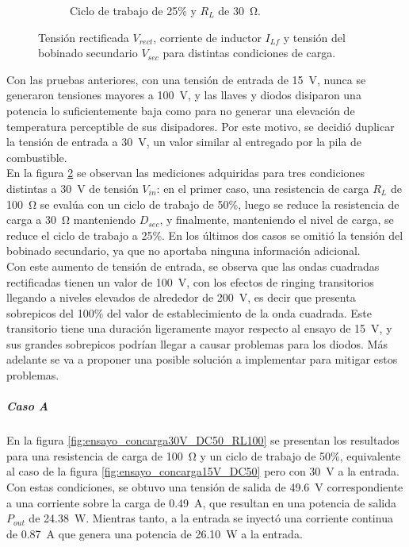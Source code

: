 \begin{figure}[h]
\begin{subfigure}{0.48\textwidth}
        \caption{Ciclo de trabajo de 25\% y $R_L$ de \SI[]{30}{\ohm}.}
        \label{fig:ensayo_concarga30V_DC25_RL30}
    \end{subfigure}
    \caption{Tensión rectificada $V_{rect}$, corriente de inductor $I_{Lf}$ y tensión del bobinado secundario $V_{sec}$ para distintas condiciones de carga.}
    \label{fig:ensayo_concarga30V}
\end{figure}

Con las pruebas anteriores, con una tensión de entrada de \SI[]{15}{\volt}, nunca se generaron tensiones mayores a \SI[]{100}{\volt}, y las llaves y diodos disiparon una potencia lo suficientemente baja como para no generar una elevación de temperatura perceptible de sus disipadores. Por este motivo, se decidió duplicar la tensión de entrada a \SI[]{30}{\volt}, un valor similar al entregado por la pila de combustible.\\

En la figura \ref{fig:ensayo_concarga30V} se observan las mediciones adquiridas para tres condiciones distintas a \SI[]{30}{\volt} de tensión $V_{in}$: en el primer caso, una resistencia de carga $R_L$ de \SI[]{100}{\ohm} se evalúa con un ciclo de trabajo de 50\%, luego se reduce la resistencia de carga a \SI[]{30}{\ohm} manteniendo $D_{sec}$, y finalmente, manteniendo el nivel de carga, se reduce el ciclo de trabajo a 25\%. En los últimos dos casos se omitió la tensión del bobinado secundario, ya que no aportaba ninguna información adicional.\\

Con este aumento de tensión de entrada, se observa que las ondas cuadradas rectificadas tienen un valor de \SI[]{100}{\volt}, con los efectos de ringing transitorios llegando a niveles elevados de alrededor de \SI[]{200}{\volt}, es decir que presenta sobrepicos del 100\% del valor de establecimiento de la onda cuadrada. Este transitorio tiene una duración ligeramente mayor respecto al ensayo de \SI[]{15}{\volt}, y sus grandes sobrepicos podrían llegar a causar problemas para los diodos. Más adelante se va a proponer una posible solución a implementar para mitigar estos problemas.\\

\subparagraph{Caso A}

En la figura \ref{fig:ensayo_concarga30V_DC50_RL100} se presentan los resultados para una resistencia de carga de \SI[]{100}{\ohm} y un ciclo de trabajo de 50\%, equivalente al caso de la figura \ref{fig:ensayo_concarga15V_DC50} pero con \SI{30}{\volt} a la entrada. Con estas condiciones, se obtuvo una tensión de salida de \SI[]{49.6}{\volt} correspondiente a una corriente sobre la carga de \SI[]{0.49}{\ampere}, que resultan en una potencia de salida $P_{out}$ de \SI[]{24.38}{\watt}. Mientras tanto, a la entrada se inyectó una corriente continua de \SI[]{0.87}{\ampere} que genera una potencia de \SI[]{26.10}{\watt} a la entrada.\\

